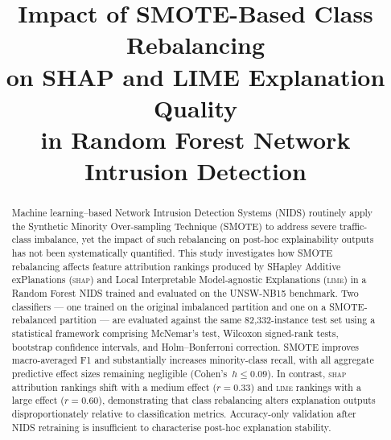 \documentclass[conference,a4paper]{IEEEtran}
\newcommand{\SHAP}{\textsc{shap}\xspace}
\newcommand{\LIME}{\textsc{lime}\xspace}
\newcommand{\NIDS}{NIDS\xspace}
\newcommand{\SMOTE}{SMOTE\xspace}
\newcommand{\cohensh}{Cohen's~$h$\xspace}
\begin{document}

\title{Impact of SMOTE-Based Class Rebalancing\\
       on SHAP and LIME Explanation Quality\\
       in Random Forest Network Intrusion Detection}

\author{%
  }

\maketitle

\begin{abstract}
Machine learning--based Network Intrusion Detection Systems (\NIDS) routinely
apply the Synthetic Minority Over-sampling Technique (\SMOTE) to address severe
traffic-class imbalance, yet the impact of such rebalancing on post-hoc
explainability outputs has not been systematically quantified. This study
investigates how \SMOTE rebalancing affects feature attribution rankings produced
by SHapley Additive exPlanations (\SHAP) and Local Interpretable Model-agnostic
Explanations (\LIME) in a Random Forest \NIDS trained and evaluated on the
UNSW-NB15 benchmark. Two classifiers --- one trained on the original imbalanced
partition and one on a \SMOTE-rebalanced partition --- are evaluated against the
same 82,332-instance test set using a statistical framework comprising McNemar's
test, Wilcoxon signed-rank tests, bootstrap confidence intervals, and
Holm--Bonferroni correction. \SMOTE improves macro-averaged F1 and substantially
increases minority-class recall, with all aggregate predictive effect sizes
remaining negligible (\cohensh $\leq 0.09$). In contrast, \SHAP attribution
rankings shift with a medium effect ($r=0.33$) and \LIME rankings with a large
effect ($r=0.60$), demonstrating that class rebalancing alters explanation outputs
disproportionately relative to classification metrics. Accuracy-only validation
after \NIDS retraining is insufficient to characterise post-hoc explanation
stability.
\end{abstract}
\end{document}
